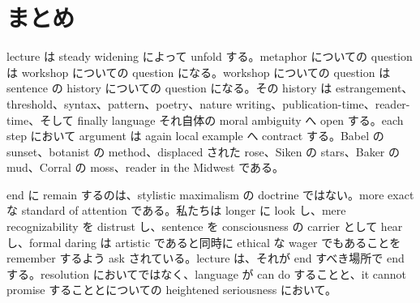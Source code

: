\section{まとめ}

lecture は steady widening によって unfold する。metaphor についての question は workshop についての question になる。workshop についての question は sentence の history についての question になる。その history は estrangement、threshold、syntax、pattern、poetry、nature writing、publication-time、reader-time、そして finally language それ自体の moral ambiguity へ open する。each step において argument は again local example へ contract する。Babel の sunset、botanist の method、displaced された rose、Siken の stars、Baker の mud、Corral の moss、reader in the Midwest である。

end に remain するのは、stylistic maximalism の doctrine ではない。more exact な standard of attention である。私たちは longer に look し、mere recognizability を distrust し、sentence を consciousness の carrier として hear し、formal daring は artistic であると同時に ethical な wager でもあることを remember するよう ask されている。lecture は、それが end すべき場所で end する。resolution においてではなく、language が can do することと、it cannot promise することとについての heightened seriousness において。